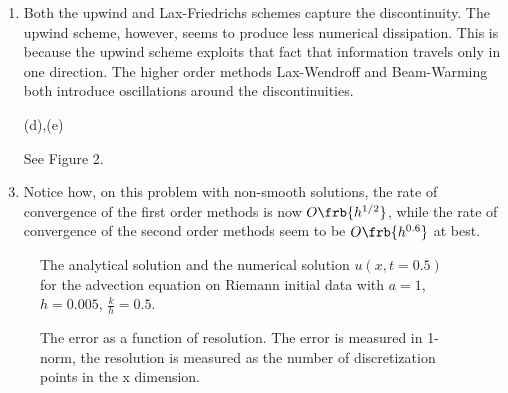\documentclass{article}
\begin{document}
\begin{exerciseList}
\begin{enumerate}
\item
Both the upwind and Lax-Friedrichs schemes capture the discontinuity.
The upwind scheme, however, seems to produce less numerical dissipation.
This is because the upwind scheme exploits that fact that information travels only in one direction.
The higher order methods Lax-Wendroff and Beam-Warming both introduce oscillations around the discontinuities.

\item[(d),(e)]
\addtocounter{enumii}{2}
See Figure 2.


\item
Notice how, on this problem with non-smooth solutions, the rate of convergence of the first order methods is now $O\frb{h^{1/2}}$, while the rate of convergence of the second order methods seem to be $O\frb{h^{0.6}}$ at best.
\end{enumerate}





\newpage
\begin{figure}[H] 
\begin{center}
\caption{ The analytical solution and the numerical solution $u(x,t=0.5)$ for the advection equation on Riemann initial data with $a=1$, $h=0.005$, $\frac{k}{h}=0.5$.} 
\end{center}
\end{figure}



\begin{figure}[H] 
\begin{center}
\caption{ The error as a function of resolution. The error is measured in 1-norm, the resolution is measured as the number of discretization points in the x dimension. }
\end{center}
\end{figure}




\newpage




\end{exerciseList}
\end{document}
